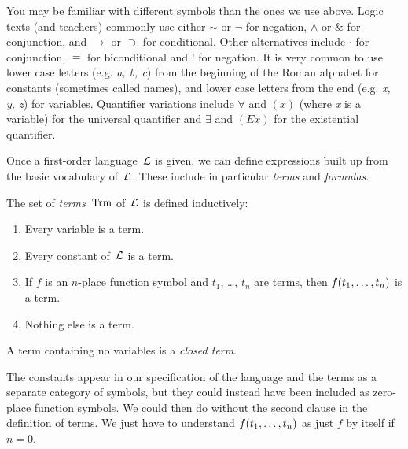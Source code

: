 \documentclass[syntax-and-semantics]{subfiles}
\begin{document}

\begin{intro}
You may be familiar with different symbols than the ones we use
above. Logic texts (and teachers) commonly use either $\sim$ or $\neg$
for negation, $\wedge$ or $\&$ for conjunction, and $\rightarrow$ or
$\supset$ for conditional. Other alternatives include $\cdot$ for
conjunction, $\equiv$ for biconditional and ! for negation. It is very
common to use lower case letters (e.g. \textit{a, b, c}) from the
beginning of the Roman alphabet for constants (sometimes called
names), and lower case letters from the end (e.g. \textit{x, y, z})
for variables. Quantifier variations include $\forall$ and $(x)$
(where \textit{x} is a variable) for the universal quantifier and
$\exists$ and $(Ex)$ for the existential quantifier.
\end{intro}


\begin{wordy}
Once a first-order language~$\mathcal L$ is given, we can define
expressions built up from the basic vocabulary of~$\mathcal L$.  These
include in particular \emph{terms} and \emph{formulas}.
\end{wordy}

\begin{defn}[Term]
The set of \emph{terms}~$\Trm$ of~$\mathcal L$ is
defined inductively:
\begin{enumerate}
\item Every variable is a term.
\item Every constant of~$\mathcal L$ is a term.
\item If $f$ is an $n$-place function symbol and $t_1$, \dots, $t_n$
  are terms, then ${ f(t_1, \ldots, t_n) }$ is a term.
\item Nothing else is a term.
\end{enumerate}
A term containing no variables is a \emph{closed term}.
\end{defn}

\begin{wordy}
The constants appear in our specification of the language and the
terms as a separate category of symbols, but they could instead have
been included as zero-place function symbols.  We could then do
without the second clause in the definition of terms. We just have to
understand ${ f(t_1, \ldots, t_n) }$ as just $f$ by itself if $n =
0$.
\end{wordy}
\end{document}
